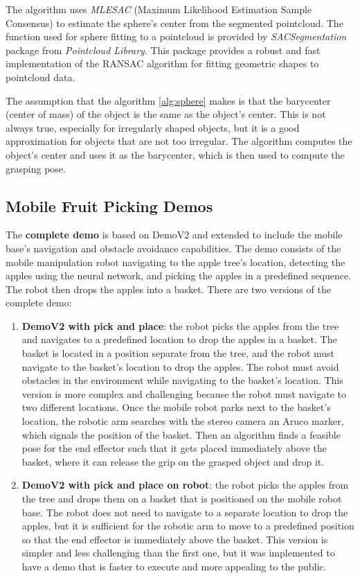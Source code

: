 The algorithm uses \textit{MLESAC} (Maximum Likelihood Estimation Sample Consensus) to estimate the sphere's center
from the segmented pointcloud. The function used for sphere fitting to a pointcloud is provided by
\textit{SACSegmentation} package from \textit{Pointcloud Library}. This package provides a robust and fast
implementation of the RANSAC algorithm for fitting geometric shapes to pointcloud data. 

The assumption that the algorithm \ref{alg:sphere} makes is that the barycenter (center of mass) of the object
is the same as the object's center. This is not always true, especially for irregularly shaped objects, but
it is a good approximation for objects that are not too irregular. The algorithm computes the object's center
and uses it as the barycenter, which is then used to compute the grasping pose.

\subsection{Mobile Fruit Picking Demos}

The \textbf{complete demo} is based on DemoV2 and extended to include the mobile base's navigation and obstacle avoidance
capabilities. The demo consists of the mobile manipulation robot navigating to the apple tree's location, detecting the apples
using the neural network, and picking the apples in a predefined sequence. The robot then drops the apples into a basket.
There are two versions of the complete demo:

\begin{enumerate}
    \item \textbf{DemoV2 with pick and place}: the robot picks the apples from the tree and navigates to a predefined
    location to drop the apples in a basket. The basket is located in a position separate from the tree, and the robot
    must navigate to the basket's location to drop the apples. The robot must avoid obstacles in the environment
    while navigating to the basket's location. This version is more complex and challenging because the robot must
    navigate to two different locations. Once the mobile robot parks next to the basket's location, the robotic
    arm searches with the stereo camera an Aruco marker, which signals the position of the basket. Then
    an algorithm finds a feasible pose for the end effector such that it gets placed immediately above the basket,
    where it can release the grip on the grasped object and drop it.
    \item \textbf{DemoV2 with pick and place on robot}: the robot picks the apples from the tree and drops them on
    a basket that is positioned on the mobile robot base. The robot does not need to navigate to a separate location
    to drop the apples, but it is sufficient for the robotic arm to move to a predefined position so that
    the end effector is immediately above the basket. This version is simpler and less challenging than the first one,
    but it was implemented to have a demo that is faster to execute and more appealing to the public.
\end{enumerate}

